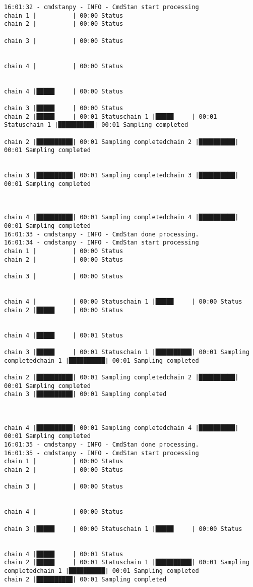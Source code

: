 \documentclass[
  letterpaper,
  DIV=11,
  numbers=noendperiod]{scrartcl}
\begin{document}
\begin{verbatim}
16:01:32 - cmdstanpy - INFO - CmdStan start processing
chain 1 |          | 00:00 Status
chain 2 |          | 00:00 Status

chain 3 |          | 00:00 Status


chain 4 |          | 00:00 Status


chain 4 |█████     | 00:00 Status

chain 3 |█████     | 00:00 Status
chain 2 |█████     | 00:01 Statuschain 1 |█████     | 00:01 Statuschain 1 |██████████| 00:01 Sampling completed

chain 2 |██████████| 00:01 Sampling completedchain 2 |██████████| 00:01 Sampling completed


chain 3 |██████████| 00:01 Sampling completedchain 3 |██████████| 00:01 Sampling completed



chain 4 |██████████| 00:01 Sampling completedchain 4 |██████████| 00:01 Sampling completed
16:01:33 - cmdstanpy - INFO - CmdStan done processing.
16:01:34 - cmdstanpy - INFO - CmdStan start processing
chain 1 |          | 00:00 Status
chain 2 |          | 00:00 Status

chain 3 |          | 00:00 Status


chain 4 |          | 00:00 Statuschain 1 |█████     | 00:00 Status
chain 2 |█████     | 00:00 Status


chain 4 |█████     | 00:01 Status

chain 3 |█████     | 00:01 Statuschain 1 |██████████| 00:01 Sampling completedchain 1 |██████████| 00:01 Sampling completed

chain 2 |██████████| 00:01 Sampling completedchain 2 |██████████| 00:01 Sampling completed
chain 3 |██████████| 00:01 Sampling completed



chain 4 |██████████| 00:01 Sampling completedchain 4 |██████████| 00:01 Sampling completed
16:01:35 - cmdstanpy - INFO - CmdStan done processing.
16:01:35 - cmdstanpy - INFO - CmdStan start processing
chain 1 |          | 00:00 Status
chain 2 |          | 00:00 Status

chain 3 |          | 00:00 Status


chain 4 |          | 00:00 Status

chain 3 |█████     | 00:00 Statuschain 1 |█████     | 00:00 Status


chain 4 |█████     | 00:01 Status
chain 2 |█████     | 00:01 Statuschain 1 |██████████| 00:01 Sampling completedchain 1 |██████████| 00:01 Sampling completed
chain 2 |██████████| 00:01 Sampling completed



\end{verbatim}
\end{document}
